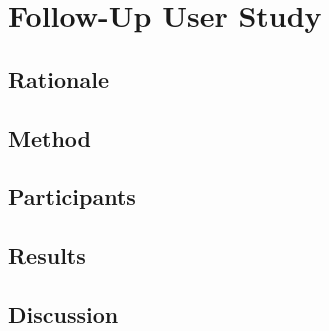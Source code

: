 
\chapter{Follow-Up User Study}
\label{chap:follow-up-user-study}

\section{Rationale}

\section{Method}

\section{Participants}

\section{Results}

\section{Discussion}

